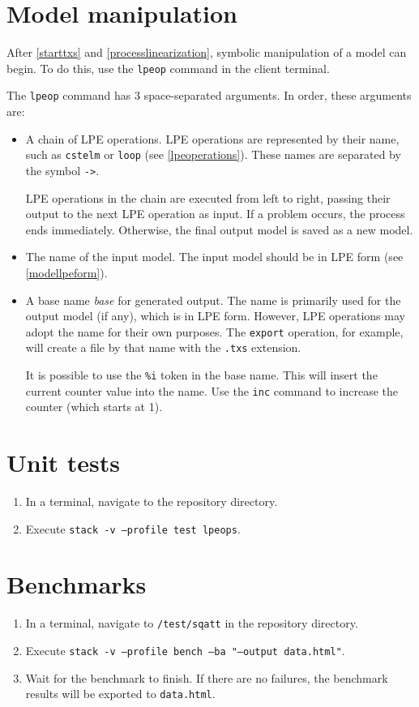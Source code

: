 \section{Model manipulation} \label{modelmanipulation}

After \ref{starttxs} and \ref{processlinearization}, symbolic manipulation of a \txs{} model can begin.
To do this, use the \texttt{lpeop} command in the client terminal.

The \texttt{lpeop} command has 3 space-separated arguments. In order, these arguments are:

\begin{itemize}
\item A chain of LPE operations.
LPE operations are represented by their name, such as \texttt{cstelm} or \texttt{loop} (see \ref{lpeoperations}).
These names are separated by the symbol \texttt{->}.

LPE operations in the chain are executed from left to right, passing their output to the next LPE operation as input.
If a problem occurs, the process ends immediately.
Otherwise, the final output model is saved as a new model.
\item The name of the input model.
The input model should be in LPE form (see \ref{modellpeform}).
\item A base name \textit{base} for generated output.
The name is primarily used for the output model (if any), which is in LPE form.
However, LPE operations may adopt the name for their own purposes.
The \texttt{export} operation, for example, will create a file by that name with the \texttt{.txs} extension.

It is possible to use the \texttt{\%i} token in the base name.
This will insert the current counter value into the name.
Use the \texttt{inc} command to increase the counter (which starts at 1).
\end{itemize}

\section{Unit tests}

\begin{enumerate}
\item In a terminal, navigate to the repository directory.
\item Execute \texttt{stack -v --profile test lpeops}.
\end{enumerate}

\section{Benchmarks}

\begin{enumerate}
\item In a terminal, navigate to \texttt{/test/sqatt} in the repository directory.
\item Execute \texttt{stack -v --profile bench --ba "--output data.html"}.
\item Wait for the benchmark to finish.
If there are no failures, the benchmark results will be exported to \texttt{data.html}.
\end{enumerate}

